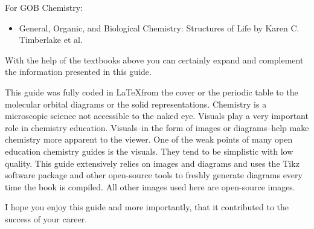 \documentclass[main.tex]{subfiles}
\begin{document}
\begin{fullwidth}
\begin{multicols*}{2}
For GOB Chemistry:
\begin{small}\begin{itemize}[label=]
\setlength\itemsep{0.5em}\item General, Organic, and Biological Chemistry: Structures of Life by Karen C. Timberlake et al.
\end{itemize}\end{small}

With the help of the textbooks above you can certainly expand and complement the information presented in this guide.

This guide was fully coded in \LaTeX from the cover or the periodic table to the molecular orbital diagrams or the solid representations. Chemistry is a microscopic science not accessible to the naked eye. Visuals play a very important role in chemistry education. Visuals--in the form of images or diagrams--help make chemistry more apparent to the viewer. One of the weak points of many open education chemistry guides is the visuals. They tend to be simplistic with low quality. This guide extensively relies on images and diagrams and uses the Tikz software package and other open-source tools to freshly generate diagrams every time the book is compiled. All other images used here are open-source images.

I hope you enjoy this guide and more importantly, that it contributed to the success of your career.  
\end{multicols*}
\clearpage\thispagestyle{empty}\mbox{}\clearpage

\end{fullwidth}
\restoregeometry
{}
\end{document}
